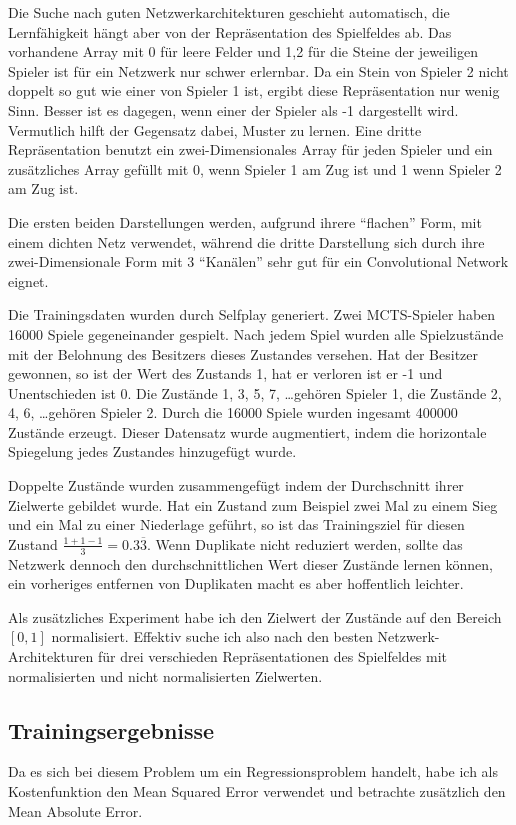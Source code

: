 Die Suche nach guten Netzwerkarchitekturen geschieht automatisch, die Lernfähigkeit hängt aber von der Repräsentation des Spielfeldes ab.
Das vorhandene Array mit 0 für leere Felder und 1,2 für die Steine der jeweiligen Spieler ist für ein Netzwerk nur schwer erlernbar.
Da ein Stein von Spieler 2 nicht doppelt so gut wie einer von Spieler 1 ist, ergibt diese Repräsentation nur wenig Sinn.
Besser ist es dagegen, wenn einer der Spieler als -1 dargestellt wird.
Vermutlich hilft der Gegensatz dabei, Muster zu lernen.
Eine dritte Repräsentation benutzt ein zwei-Dimensionales Array für jeden Spieler und ein zusätzliches Array gefüllt mit 0, wenn Spieler 1 am Zug ist und 1 wenn Spieler 2 am Zug ist.


Die ersten beiden Darstellungen werden, aufgrund ihrere ``flachen'' Form, mit einem dichten Netz verwendet, während die dritte Darstellung sich durch ihre zwei-Dimensionale Form mit 3 ``Kanälen'' sehr gut für ein Convolutional Network eignet.


Die Trainingsdaten wurden durch Selfplay generiert.
Zwei MCTS-Spieler haben 16000 Spiele gegeneinander gespielt.
Nach jedem Spiel wurden alle Spielzustände mit der Belohnung des Besitzers dieses Zustandes versehen.
Hat der Besitzer gewonnen, so ist der Wert des Zustands 1, hat er verloren ist er -1 und Unentschieden ist 0.
Die Zustände 1, 3, 5, 7, \ldots gehören Spieler 1, die Zustände 2, 4, 6, \ldots gehören Spieler 2.
Durch die 16000 Spiele wurden ingesamt 400000 Zustände erzeugt.
Dieser Datensatz wurde augmentiert, indem die horizontale Spiegelung jedes Zustandes hinzugefügt wurde.

Doppelte Zustände wurden zusammengefügt indem der Durchschnitt ihrer Zielwerte gebildet wurde.
Hat ein Zustand zum Beispiel zwei Mal zu einem Sieg und ein Mal zu einer Niederlage geführt, so ist das Trainingsziel für diesen Zustand $\frac{1+1-1}{3} = 0.3\overline{3}$.
Wenn Duplikate nicht reduziert werden, sollte das Netzwerk dennoch den durchschnittlichen Wert dieser Zustände lernen können, ein vorheriges entfernen von Duplikaten macht es aber hoffentlich leichter.

Als zusätzliches Experiment habe ich den Zielwert der Zustände auf den Bereich $[0,1]$ normalisiert.
Effektiv suche ich also nach den besten Netzwerk-Architekturen für drei verschieden Repräsentationen des Spielfeldes mit normalisierten und nicht normalisierten Zielwerten.

\subsection{Trainingsergebnisse}
Da es sich bei diesem Problem um ein Regressionsproblem handelt, habe ich als Kostenfunktion den Mean Squared Error verwendet und betrachte zusätzlich den Mean Absolute Error.

